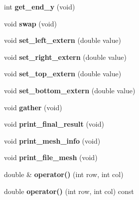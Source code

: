 \begin{DoxyCompactItemize}
\item 
\hypertarget{classMesh_afb660bee7134556c17eacdc0b0df5200}{
int {\bfseries get\_\-end\_\-y} (void)}
\label{classMesh_afb660bee7134556c17eacdc0b0df5200}

\item 
\hypertarget{classMesh_a926d6c25952e2e2f8261228ed417966c}{
void {\bfseries swap} (void)}
\label{classMesh_a926d6c25952e2e2f8261228ed417966c}

\item 
\hypertarget{classMesh_a2d056da5ad8408baa753fc1afce15ba9}{
void {\bfseries set\_\-left\_\-extern} (double value)}
\label{classMesh_a2d056da5ad8408baa753fc1afce15ba9}

\item 
\hypertarget{classMesh_a8161cdd80127b35b83e352c8df7d8ff6}{
void {\bfseries set\_\-right\_\-extern} (double value)}
\label{classMesh_a8161cdd80127b35b83e352c8df7d8ff6}

\item 
\hypertarget{classMesh_ab6467707079e94c3b052193c366a82e2}{
void {\bfseries set\_\-top\_\-extern} (double value)}
\label{classMesh_ab6467707079e94c3b052193c366a82e2}

\item 
\hypertarget{classMesh_a8d2c7c3529e4d4c10dfecb317673d89a}{
void {\bfseries set\_\-bottom\_\-extern} (double value)}
\label{classMesh_a8d2c7c3529e4d4c10dfecb317673d89a}

\item 
\hypertarget{classMesh_aedb4f86ed1d5de5958378b8d93cfba1c}{
void {\bfseries gather} (void)}
\label{classMesh_aedb4f86ed1d5de5958378b8d93cfba1c}

\item 
\hypertarget{classMesh_aa2e6c4eb116015e0520012d49bf8b43d}{
void {\bfseries print\_\-final\_\-result} (void)}
\label{classMesh_aa2e6c4eb116015e0520012d49bf8b43d}

\item 
\hypertarget{classMesh_ac15584de6d68515e6199ba24b005698d}{
void {\bfseries print\_\-mesh\_\-info} (void)}
\label{classMesh_ac15584de6d68515e6199ba24b005698d}

\item 
\hypertarget{classMesh_aad8e8997e3ffeca92a26475575d0de59}{
void {\bfseries print\_\-file\_\-mesh} (void)}
\label{classMesh_aad8e8997e3ffeca92a26475575d0de59}

\item 
\hypertarget{classMesh_ae134b3bbbb1626aa4141f7d7a7e3f936}{
double \& {\bfseries operator()} (int row, int col)}
\label{classMesh_ae134b3bbbb1626aa4141f7d7a7e3f936}

\item 
\hypertarget{classMesh_a777b6b595a0cbabd4354c8ea13fc788a}{
double {\bfseries operator()} (int row, int col) const }
\label{classMesh_a777b6b595a0cbabd4354c8ea13fc788a}

\end{DoxyCompactItemize}
